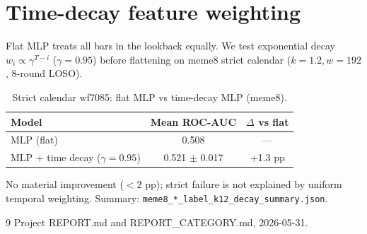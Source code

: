 \documentclass[11pt,a4paper]{article}
\begin{document}
\appendix
\section{Time-decay feature weighting}
Flat MLP treats all bars in the lookback equally. We test exponential decay
$w_i \propto \gamma^{T-i}$ ($\gamma{=}0.95$) before flattening on meme8 strict calendar
($k{=}1.2, w{=}192$, 8-round LOSO).

\begin{table}[h]
\centering
\caption{Strict calendar wf7085: flat MLP vs time-decay MLP (meme8).}
\begin{tabular}{lcc}
\toprule
Model & Mean ROC-AUC & $\Delta$ vs flat \\
\midrule
MLP (flat) & 0.508 & --- \\
MLP + time decay ($\gamma{=}0.95$) & 0.521 $\pm$ 0.017 & +1.3 pp \\
\bottomrule
\end{tabular}
\end{table}

No material improvement ($<2$ pp); strict failure is not explained by uniform temporal weighting.
Summary: \texttt{meme8\_*\_label\_k12\_decay\_summary.json}.


\begin{thebibliography}{9}
 Project REPORT.md and REPORT\_CATEGORY.md, 2026-05-31.
\end{thebibliography}
\end{document}
